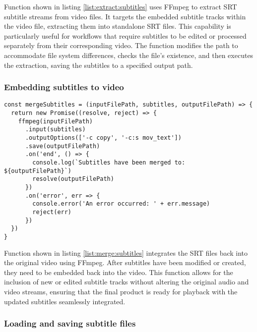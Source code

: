 \noindent Function shown in listing \ref{list:extract:subtitles} uses FFmpeg to extract SRT subtitle streams from video files. It targets the embedded subtitle tracks within the video file, extracting them into standalone SRT files. This capability is particularly useful for workflows that require subtitles to be edited or processed separately from their corresponding video. The function modifies the path to accommodate file system differences, checks the file's existence, and then executes the extraction, saving the subtitles to a specified output path.

\subsubsection{Embedding subtitles to video}

\begin{clisting}
\label{list:merge:subtitles}
\begin{verbatim}
const mergeSubtitles = (inputFilePath, subtitles, outputFilePath) => {
  return new Promise((resolve, reject) => {
    ffmpeg(inputFilePath)
      .input(subtitles)
      .outputOptions(['-c copy', '-c:s mov_text'])
      .save(outputFilePath)
      .on('end', () => {
        console.log(`Subtitles have been merged to: ${outputFilePath}`)
        resolve(outputFilePath)
      })
      .on('error', err => {
        console.error('An error occurred: ' + err.message)
        reject(err)
      })
  })
}
\end{verbatim}
\end{clisting}
\noindent Function shown in listing \ref{list:merge:subtitles} integrates the SRT files back into the original video using FFmpeg. After subtitles have been modified or created, they need to be embedded back into the video. This function allows for the inclusion of new or edited subtitle tracks without altering the original audio and video streams, ensuring that the final product is ready for playback with the updated subtitles seamlessly integrated.

\subsubsection{Loading and saving subtitle files}

